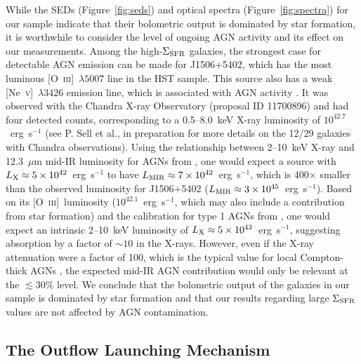 \documentclass[12pt,preprint]{aastex}
\newcommand{\nev}{[\textrm{Ne}~\textsc{v}]}
\newcommand{\oiii}{[\textrm{O}~\textsc{iii}]}
\newcommand{\sigmasfr}{\Sigma_{\textnormal{\scriptsize{SFR}}}}
\begin{document}
While the SEDs (Figure~\ref{fig:seds}) and optical spectra
(Figure~\ref{fig:spectra}) for our sample indicate that their
bolometric output is dominated by star formation, it is worthwhile to
consider the level of ongoing AGN activity and its effect on our
measurements.  Among the high-$\sigmasfr$ galaxies, the strongest case
for detectable AGN emission can be made for J1506+5402, which has the
most luminous \oiii~$\lambda5007$ line in the HST sample.  This source
also has a weak \nev~$\lambda3426$ emission line, which is associated
with AGN activity \citep{gil10}.  It was observed with the Chandra
X-ray Observatory (proposal ID 11700896) and had four detected counts,
corresponding to a 0.5--8.0~keV X-ray luminosity of
$10^{42.7}$~erg~s$^{-1}$ (see P. Sell et al., in preparation for more
details on the 12/29 galaxies with Chandra observations).  Using the
relationship between 2--10~keV X-ray and 12.3~$\mu$m mid-IR luminosity
for AGNs from \citet{gan09}, one would expect a source with
$L_{\textnormal{\scriptsize{X}}}\approx5\times10^{42}$~erg~s$^{-1}$ to
have
$L_{\textnormal{\scriptsize{MIR}}}\approx7\times10^{42}$~erg~s$^{-1}$,
which is 400$\times$ smaller than the observed luminosity for
J1506+5402
($L_{\textnormal{\scriptsize{MIR}}}\approx3\times10^{45}$~erg~s$^{-1}$).
Based on its \oiii\ luminosity ($10^{42.1}$~erg~s$^{-1}$, which may
also include a contribution from star formation) and the calibration
for type 1 AGNs from \citet{hec05}, one would expect an intrinsic
2--10~keV luminosity of
$L_{\textnormal{\scriptsize{X}}}\approx5\times10^{43}$~erg~s$^{-1}$,
suggesting absorption by a factor of $\sim10$ in the X-rays.  However,
even if the X-ray attenuation were a factor of 100, which is the
typical value for local Compton-thick AGNs \citep{dia09}, the expected
mid-IR AGN contribution would only be relevant at the $\lesssim$30\%
level.  We conclude that the bolometric output of the galaxies in our
sample is dominated by star formation and that our results regarding
large $\sigmasfr$ values are not affected by AGN contamination.

\subsection{The Outflow Launching Mechanism}\label{sec:launch}
\end{document}
